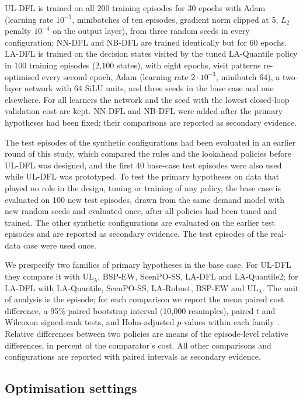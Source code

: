 UL-DFL is trained on all 200 training episodes for 30 epochs with Adam (learning rate $10^{-3}$, minibatches of ten episodes, gradient norm clipped at 5, $L_2$ penalty $10^{-4}$ on the output layer), from three random seeds in every configuration; NN-DFL and NB-DFL are trained identically but for 60 epochs. LA-DFL is trained on the decision states visited by the tuned LA-Quantile policy in 100 training episodes (2,100 states), with eight epochs, visit patterns re-optimised every second epoch, Adam (learning rate $2\cdot10^{-3}$, minibatch 64), a two-layer network with 64 SiLU units, and three seeds in the base case and one elsewhere. For all learners the network and the seed with the lowest closed-loop validation cost are kept. NN-DFL and NB-DFL were added after the primary hypotheses had been fixed; their comparisons are reported as secondary evidence.

The test episodes of the synthetic configurations had been evaluated in an earlier round of this study, which compared the rules and the lookahead policies before UL-DFL was designed, and the first 40 base-case test episodes were also used while UL-DFL was prototyped. To test the primary hypotheses on data that played no role in the design, tuning or training of any policy, the base case is evaluated on 100 new test episodes, drawn from the same demand model with new random seeds and evaluated once, after all policies had been tuned and trained. The other synthetic configurations are evaluated on the earlier test episodes and are reported as secondary evidence. The test episodes of the real-data case were used once.

We prespecify two families of primary hypotheses in the base case. For UL-DFL they compare it with UL$_\lambda$, BSP-EW, ScenPO-SS, LA-DFL and LA-Quantile2; for LA-DFL with LA-Quantile, ScenPO-SS, LA-Robust, BSP-EW and UL$_\lambda$. The unit of analysis is the episode; for each comparison we report the mean paired cost difference, a 95\% paired bootstrap interval (10,000 resamples), paired $t$ and Wilcoxon signed-rank tests, and Holm-adjusted $p$-values within each family \citep{holm1979simple}. Relative differences between two policies are means of the episode-level relative differences, in percent of the comparator's cost. All other comparisons and configurations are reported with paired intervals as secondary evidence.

\subsection{Optimisation settings}\label{sec:solver}

